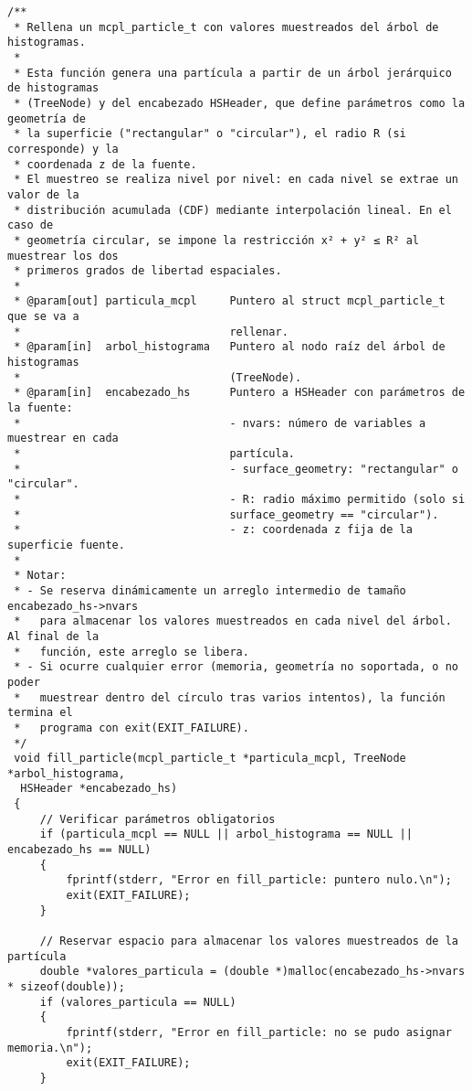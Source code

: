 \begin{verbatim}
/**
 * Rellena un mcpl_particle_t con valores muestreados del árbol de histogramas.
 *
 * Esta función genera una partícula a partir de un árbol jerárquico de histogramas 
 * (TreeNode) y del encabezado HSHeader, que define parámetros como la geometría de
 * la superficie ("rectangular" o "circular"), el radio R (si corresponde) y la 
 * coordenada z de la fuente.
 * El muestreo se realiza nivel por nivel: en cada nivel se extrae un valor de la
 * distribución acumulada (CDF) mediante interpolación lineal. En el caso de 
 * geometría circular, se impone la restricción x² + y² ≤ R² al muestrear los dos 
 * primeros grados de libertad espaciales.
 *
 * @param[out] particula_mcpl     Puntero al struct mcpl_particle_t que se va a 
 *                                rellenar.
 * @param[in]  arbol_histograma   Puntero al nodo raíz del árbol de histogramas 
 *                                (TreeNode).
 * @param[in]  encabezado_hs      Puntero a HSHeader con parámetros de la fuente:
 *                                - nvars: número de variables a muestrear en cada 
 *                                partícula.
 *                                - surface_geometry: "rectangular" o "circular".
 *                                - R: radio máximo permitido (solo si 
 *                                surface_geometry == "circular").
 *                                - z: coordenada z fija de la superficie fuente.
 *
 * Notar:
 * - Se reserva dinámicamente un arreglo intermedio de tamaño encabezado_hs->nvars
 *   para almacenar los valores muestreados en cada nivel del árbol. Al final de la
 *   función, este arreglo se libera.
 * - Si ocurre cualquier error (memoria, geometría no soportada, o no poder 
 *   muestrear dentro del círculo tras varios intentos), la función termina el 
 *   programa con exit(EXIT_FAILURE).
 */
 void fill_particle(mcpl_particle_t *particula_mcpl, TreeNode *arbol_histograma,
  HSHeader *encabezado_hs)
 {
     // Verificar parámetros obligatorios
     if (particula_mcpl == NULL || arbol_histograma == NULL || encabezado_hs == NULL)
     {
         fprintf(stderr, "Error en fill_particle: puntero nulo.\n");
         exit(EXIT_FAILURE);
     }
 
     // Reservar espacio para almacenar los valores muestreados de la partícula
     double *valores_particula = (double *)malloc(encabezado_hs->nvars * sizeof(double));
     if (valores_particula == NULL)
     {
         fprintf(stderr, "Error en fill_particle: no se pudo asignar memoria.\n");
         exit(EXIT_FAILURE);
     }
 

\end{verbatim}
